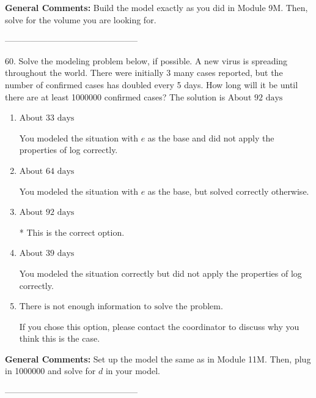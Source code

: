 \documentclass{extbook}[14pt]
\begin{document}
\textbf{General Comments:} Build the model exactly as you did in Module 9M. Then, solve for the volume you are looking for.

-----------------------------------------------

60. Solve the modeling problem below, if possible.
A new virus is spreading throughout the world. There were initially 3 many cases reported, but the number of confirmed cases has doubled every 5 days. How long will it be until there are at least 1000000 confirmed cases? 
The solution is $ \text{About } 92 \text{ days} $ 

\begin{enumerate}[label=\Alph*.] 
\item $ \text{About } 33 \text{ days} $ 

 You modeled the situation with $e$ as the base and did not apply the properties of log correctly. 
\item $ \text{About } 64 \text{ days} $ 

 You modeled the situation with $e$ as the base, but solved correctly otherwise. 
\item $ \text{About } 92 \text{ days} $ 

 * This is the correct option. 
\item $ \text{About } 39 \text{ days} $ 

 You modeled the situation correctly but did not apply the properties of log correctly. 
\item $ \text{There is not enough information to solve the problem.} $ 

 If you chose this option, please contact the coordinator to discuss why you think this is the case. 
\end{enumerate} 
 
\textbf{General Comments:} Set up the model the same as in Module 11M. Then, plug in 1000000 and solve for $d$ in your model.

-----------------------------------------------
\end{document}

